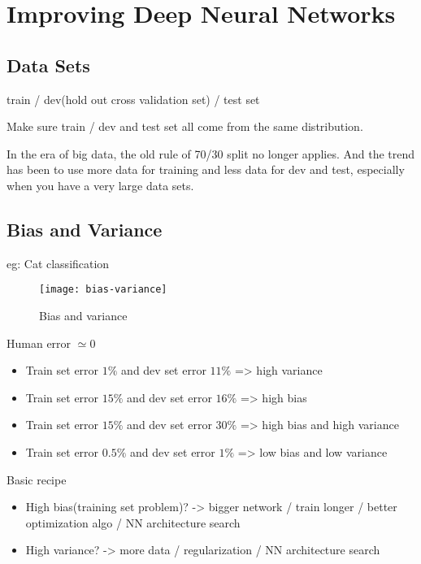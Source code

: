 \section{Improving Deep Neural Networks}

\subsection{Data Sets}
train / dev(hold out cross validation set) / test set

Make sure train / dev and test set all come from the same distribution.

In the era of big data, the old rule of 70/30 split no longer applies.
And the trend has been to use more data for training and less data for dev and test, especially when you have a very large data sets.

\subsection{Bias and Variance}
eg: Cat classification

\immediate{}
\begin{figure}[htbp]
	\centering
	\texttt{[image: bias-variance]}\\
	\caption{Bias and variance}
	\label{fig.bias-variance}
\end{figure}

Human error $\simeq 0$
\begin{itemize}
\item Train set error $1\%$ and dev set error $11\%$ => high variance
\item Train set error $15\%$ and dev set error $16\%$ => high bias
\item Train set error $15\%$ and dev set error $30\%$ => high bias and high variance
\item Train set error $0.5\%$ and dev set error $1\%$ => low bias and low variance
\end{itemize}

Basic recipe
\begin{itemize}
\item High bias(training set problem)? -> bigger network / train longer / better optimization algo / NN architecture search
\item High variance? -> more data / regularization / NN architecture search
\end{itemize}

